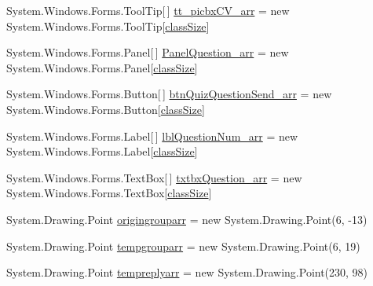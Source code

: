\begin{DoxyCompactItemize}
\item 
\-System.\-Windows.\-Forms.\-Tool\-Tip\mbox{[}$\,$\mbox{]} \hyperlink{class_sr_p___classroom_inq_1_1frm_classrrom_inq_a2b443a71216ac1b9a63f9db496161a4d}{tt\-\_\-picbx\-C\-V\-\_\-arr} = new \-System.\-Windows.\-Forms.\-Tool\-Tip\mbox{[}\hyperlink{class_sr_p___classroom_inq_1_1frm_classrrom_inq_a78d9aab335edfe53d39036b9d89928a8}{class\-Size}\mbox{]}
\item 
\-System.\-Windows.\-Forms.\-Panel\mbox{[}$\,$\mbox{]} \hyperlink{class_sr_p___classroom_inq_1_1frm_classrrom_inq_a5c89025435cd16c638fbc91999b74f80}{\-Panel\-Question\-\_\-arr} = new \-System.\-Windows.\-Forms.\-Panel\mbox{[}\hyperlink{class_sr_p___classroom_inq_1_1frm_classrrom_inq_a78d9aab335edfe53d39036b9d89928a8}{class\-Size}\mbox{]}
\item 
\-System.\-Windows.\-Forms.\-Button\mbox{[}$\,$\mbox{]} \hyperlink{class_sr_p___classroom_inq_1_1frm_classrrom_inq_a007012d0330b5c8ad6b29271ddefe7f9}{btn\-Quiz\-Question\-Send\-\_\-arr} = new \-System.\-Windows.\-Forms.\-Button\mbox{[}\hyperlink{class_sr_p___classroom_inq_1_1frm_classrrom_inq_a78d9aab335edfe53d39036b9d89928a8}{class\-Size}\mbox{]}
\item 
\-System.\-Windows.\-Forms.\-Label\mbox{[}$\,$\mbox{]} \hyperlink{class_sr_p___classroom_inq_1_1frm_classrrom_inq_ae46e928c386c686caa96bfe4f302c2f1}{lbl\-Question\-Num\-\_\-arr} = new \-System.\-Windows.\-Forms.\-Label\mbox{[}\hyperlink{class_sr_p___classroom_inq_1_1frm_classrrom_inq_a78d9aab335edfe53d39036b9d89928a8}{class\-Size}\mbox{]}
\item 
\-System.\-Windows.\-Forms.\-Text\-Box\mbox{[}$\,$\mbox{]} \hyperlink{class_sr_p___classroom_inq_1_1frm_classrrom_inq_ac8b5f7f10341c6c43066881afcbbcaaa}{txtbx\-Question\-\_\-arr} = new \-System.\-Windows.\-Forms.\-Text\-Box\mbox{[}\hyperlink{class_sr_p___classroom_inq_1_1frm_classrrom_inq_a78d9aab335edfe53d39036b9d89928a8}{class\-Size}\mbox{]}
\item 
\-System.\-Drawing.\-Point \hyperlink{class_sr_p___classroom_inq_1_1frm_classrrom_inq_ace01ba3289e75624d67b90f742c195f5}{origingrouparr} = new \-System.\-Drawing.\-Point(6, -\/13)
\item 
\-System.\-Drawing.\-Point \hyperlink{class_sr_p___classroom_inq_1_1frm_classrrom_inq_a6c8231644b9d1f92d08f110b003d621e}{tempgrouparr} = new \-System.\-Drawing.\-Point(6, 19)
\item 
\-System.\-Drawing.\-Point \hyperlink{class_sr_p___classroom_inq_1_1frm_classrrom_inq_ac6007ba00a6fab2fca4b74c0e588e850}{tempreplyarr} = new \-System.\-Drawing.\-Point(230, 98)

\end{DoxyCompactItemize}
